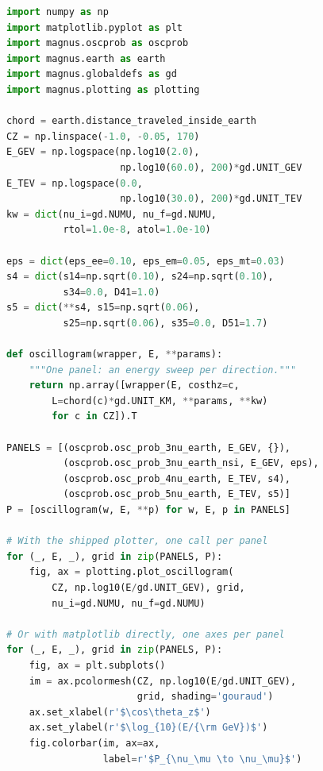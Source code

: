 \documentclass[final,5p,times,twocolumn,sort,compress]{elsarticle}
\makeatletter
\newcommand{\fig}{Fig.}
\DeclareRobustCommand{\_}{%
  \ifmmode\nfss@text{\textunderscore}\else\textunderscore\allowbreak\fi}
\newcommand{\figu}[1]{\fig~\ref{fig:#1}}
\makeatother
\begin{document}
\begin{lstlisting}[language=Python, caption={\textbf{Oscillograms through the Earth.} The four panels of \figu{oscillogram}. One wrapper call per arrival direction returns an energy sweep, with the chord length taken from the direction alone. Only the wrapper and its extra parameters change between panels. Each panel is drawn twice: first by {\tt plotting.plot\_oscillogram}, then by {\tt matplotlib} directly. Both put $\cos\theta_z$ on the horizontal axis; \figu{oscillogram} puts it on the vertical one. See Sec.~\ref{sec:earth_oscillograms} for details.}, label={lst:oscillogram}, float=tbp]
import numpy as np
import matplotlib.pyplot as plt
import magnus.oscprob as oscprob
import magnus.earth as earth
import magnus.globaldefs as gd
import magnus.plotting as plotting

chord = earth.distance_traveled_inside_earth
CZ = np.linspace(-1.0, -0.05, 170)
E_GEV = np.logspace(np.log10(2.0),
                    np.log10(60.0), 200)*gd.UNIT_GEV
E_TEV = np.logspace(0.0,
                    np.log10(30.0), 200)*gd.UNIT_TEV
kw = dict(nu_i=gd.NUMU, nu_f=gd.NUMU,
          rtol=1.0e-8, atol=1.0e-10)

eps = dict(eps_ee=0.10, eps_em=0.05, eps_mt=0.03)
s4 = dict(s14=np.sqrt(0.10), s24=np.sqrt(0.10),
          s34=0.0, D41=1.0)
s5 = dict(**s4, s15=np.sqrt(0.06),
          s25=np.sqrt(0.06), s35=0.0, D51=1.7)

def oscillogram(wrapper, E, **params):
    """One panel: an energy sweep per direction."""
    return np.array([wrapper(E, costhz=c,
        L=chord(c)*gd.UNIT_KM, **params, **kw)
        for c in CZ]).T

PANELS = [(oscprob.osc_prob_3nu_earth, E_GEV, {}),
          (oscprob.osc_prob_3nu_earth_nsi, E_GEV, eps),
          (oscprob.osc_prob_4nu_earth, E_TEV, s4),
          (oscprob.osc_prob_5nu_earth, E_TEV, s5)]
P = [oscillogram(w, E, **p) for w, E, p in PANELS]

# With the shipped plotter, one call per panel
for (_, E, _), grid in zip(PANELS, P):
    fig, ax = plotting.plot_oscillogram(
        CZ, np.log10(E/gd.UNIT_GEV), grid,
        nu_i=gd.NUMU, nu_f=gd.NUMU)

# Or with matplotlib directly, one axes per panel
for (_, E, _), grid in zip(PANELS, P):
    fig, ax = plt.subplots()
    im = ax.pcolormesh(CZ, np.log10(E/gd.UNIT_GEV),
                       grid, shading='gouraud')
    ax.set_xlabel(r'$\cos\theta_z$')
    ax.set_ylabel(r'$\log_{10}(E/{\rm GeV})$')
    fig.colorbar(im, ax=ax,
                 label=r'$P_{\nu_\mu \to \nu_\mu}$')
\end{lstlisting}
\end{document}

